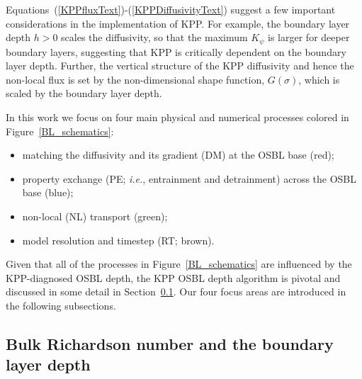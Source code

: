 \documentclass[preprint,12pt,authoryear]{agujournal}
\begin{document}
Equations~(\ref{KPPfluxText})-(\ref{KPPDiffusivityText}) suggest a few important considerations in the implementation of KPP. For example, the boundary layer depth $h >0$ scales the diffusivity, so that the maximum $K_\psi$ is larger for deeper boundary layers, suggesting that KPP is critically dependent on the boundary layer depth.  Further, the vertical structure of the KPP diffusivity and hence the non-local flux is set by the non-dimensional shape function, $G(\sigma)$, which is scaled by the boundary layer depth.  

In this work we focus on four main physical and numerical processes colored in Figure~\ref{BL_schematics}:
\begin{itemize}
 \item matching the diffusivity and its gradient (DM) at the OSBL base (red);
  \item property exchange (PE; \textit{i.e.}, entrainment and detrainment) across the OSBL base (blue);
  \item non-local (NL) transport (green);
  \item model resolution and timestep (RT; brown).
\end{itemize}
Given that all of the processes in Figure~\ref{BL_schematics} are influenced by the KPP-diagnosed OSBL depth, the KPP OSBL depth algorithm is pivotal and discussed in some detail in Section~\ref{blDepthAlgorithm}. Our four focus areas are introduced in the following subsections.

\subsection{Bulk Richardson number and the boundary layer depth}
\label{blDepthAlgorithm}
\end{document}
